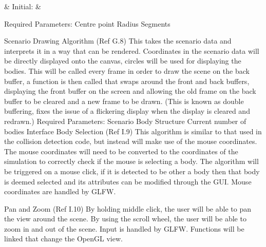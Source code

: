  & 
Initial:  & 



Required Parameters:
Centre point
Radius
Segments

Scenario Drawing Algorithm (Ref G.8)
This takes the scenario data and interprets it in a way that can be rendered.
Coordinates in the scenario data will be directly displayed onto the canvas, circles will be used for displaying the bodies.
This will be called every frame in order to draw the scene on the back buffer, a function is then called that swaps around the front and back buffers, displaying the front buffer on the screen and allowing the old frame on the back buffer to be cleared and a new frame to be drawn. (This is known as double buffering, fixes the issue of a flickering display when the display is cleared and redrawn.)
Required Parameters:
Scenario Body Structure
Current number of bodies
Interface
Body Selection (Ref I.9)
This algorithm is similar to that used in the collision detection code, but instead will make use of the mouse coordinates.
The mouse coordinates will need to be converted to the coordinates of the simulation to correctly check if the mouse is selecting a body.
The algorithm will be triggered on a mouse click, if it is detected to be other a body then that body is deemed selected and its attributes can be modified through the GUI.
Mouse coordinates are handled by GLFW.

Pan and Zoom (Ref I.10)
By holding middle click, the user will be able to pan the view around the scene.
By using the scroll wheel, the user will be able to zoom in and out of the scene.
Input is handled by GLFW. Functions will be linked that change the OpenGL view.

